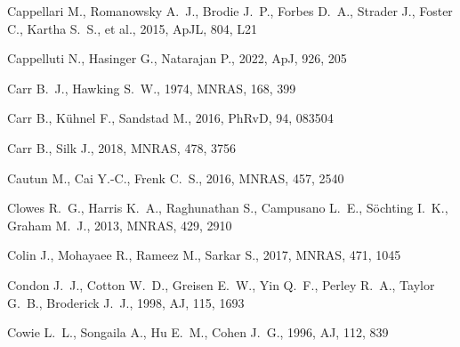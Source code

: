 \documentclass[fleqn,12pt]{article}
\begin{document}
\begin{thebibliography}{}


 Cappellari M., Romanowsky A.~J., Brodie J.~P., Forbes D.~A., Strader J., Foster C., Kartha S.~S., et al., 2015, ApJL, 804, L21

 Cappelluti N., Hasinger G., Natarajan P., 2022, ApJ, 926, 205

 Carr B.~J., Hawking S.~W., 1974, MNRAS, 168, 399

 Carr B., K{\"u}hnel F., Sandstad M., 2016, PhRvD, 94, 083504

 Carr B., Silk J., 2018, MNRAS, 478, 3756

 Cautun M., Cai Y.-C., Frenk C.~S., 2016, MNRAS, 457, 2540

 Clowes R.~G., Harris K.~A., Raghunathan S., Campusano L.~E., S{\"o}chting I.~K., Graham M.~J., 2013, MNRAS, 429, 2910

 Colin J., Mohayaee R., Rameez M., Sarkar S., 2017, MNRAS, 471, 1045


 Condon J.~J., Cotton W.~D., Greisen E.~W., Yin Q.~F., Perley R.~A., Taylor G.~B., Broderick J.~J., 1998, AJ, 115, 1693

 Cowie L.~L., Songaila A., Hu E.~M., Cohen J.~G., 1996, AJ, 112, 839


\end{thebibliography}
\end{document}
